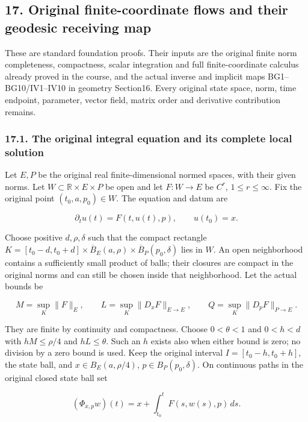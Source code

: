\documentclass[
  11pt,
]{article}
\begin{document}
\subsection{17. Original finite-coordinate flows and their geodesic
receiving
map}\label{original-finite-coordinate-flows-and-their-geodesic-receiving-map}

These are standard foundation proofs. Their inputs are the original
finite norm completeness, compactness, scalar integration and full
finite-coordinate calculus already proved in the course, and the actual
inverse and implicit maps BG1--BG10/IV1--IV10 in geometry Section16.
Every original state space, norm, time endpoint, parameter, vector
field, matrix order and derivative contribution remains.

\subsubsection{17.1. The original integral equation and its complete
local
solution}\label{the-original-integral-equation-and-its-complete-local-solution}

Let \(E,P\) be the original real finite-dimensional normed spaces, with
their given norms. Let \(W\subset\mathbb R\times E\times P\) be open and
let \(F:W\to E\) be \(C^r\), \(1\leq r\leq\infty\). Fix the original
point \((t_0,a,p_0)\in W\). The equation and datum are

\[
 \partial_tu(t)=F(t,u(t),p),\qquad u(t_0)=x.
 \tag{NF1}
\]

Choose positive \(d,\rho,\delta\) such that the compact rectangle
\(K=[t_0-d,t_0+d]\times\overline B_E(a,\rho)\times\overline B_P(p_0,\delta)\)
lies in \(W\). An open neighborhood contains a sufficiently small
product of balls; their closures are compact in the original norms and
can still be chosen inside that neighborhood. Let the actual bounds be

\[
 M=\sup_K\|F\|_E,\qquad
 L=\sup_K\|D_xF\|_{E\to E},\qquad
 Q=\sup_K\|D_pF\|_{P\to E}.
 \tag{NF2}
\]

They are finite by continuity and compactness. Choose \(0<\theta<1\) and
\(0<h<d\) with \(hM\leq\rho/4\) and \(hL\leq\theta\). Such an \(h\)
exists also when either bound is zero; no division by a zero bound is
used. Keep the original interval \(I=[t_0-h,t_0+h]\), the state ball,
and \(x\in B_E(a,\rho/4)\), \(p\in B_P(p_0,\delta)\). On continuous
paths in the original closed state ball set

\[
 (\Phi_{x,p}w)(t)=x+\int_{t_0}^{t}F(s,w(s),p)\,ds .
 \tag{NF3}
\]
\end{document}
